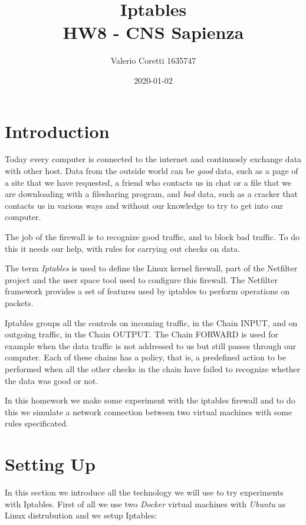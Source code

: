\documentclass[11pt]{article}
\title{{\bf Iptables} \\ \bigskip \large HW8 - CNS Sapienza}
\date{2020-01-02}
\author{Valerio Coretti 1635747}
\begin{document}
\maketitle

\section{Introduction}
Today every computer is connected to the internet and continuosly exchange data with other host. Data from the outside world can be {\em good} data, such as a page of a site that we have requested, a friend who contacts us in chat or a file that we are downloading with a filesharing program, and {\em bad} data, such as a cracker that contacts us in various ways and without our knowledge to try to get into our computer.

The job of the firewall is to recognize good traffic, and to block bad traffic. To do this it needs our help, with rules for carrying out checks on data.

The term {\em Iptables} is used to define the Linux kernel firewall, part of the Netfilter project and the user space tool used to configure this firewall. The Netfilter framework provides a set of features used by iptables to perform operations on packets.

Iptables groups all the controls on incoming traffic, in the Chain INPUT, and on outgoing traffic, in the Chain OUTPUT. The Chain FORWARD is used for example when the data traffic is not addressed to us but still passes through our computer. Each of these chains has a policy, that is, a predefined action to be performed when all the other checks in the chain have failed to recognize whether the data was good or not.

In this homework we make some experiment with the iptables firewall and to do this we simulate a network connection between two virtual machines with some rules specificated.

\section{Setting Up}
In this section we introduce all the technology we will use to try experiments with Iptables. First of all we use two {\em Docker} virtual machines with {\em Ubuntu} as Linux distrubution and we setup Iptables:
\end{document}
